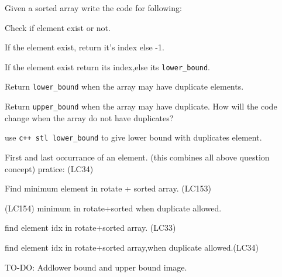 \clearpage
\begin{exercise}

     \begin{compactenum}
          \item 
     \end{compactenum}

     
\end{exercise}


\begin{exercise}
    Given a sorted array write the code for following:

   \begin{compactenum}
        \item Check if element exist or not.
        \item If the element exist, return it's index else -1.
        \item If the element exist return its index,else its \verb|lower_bound|.
        \item Return \verb|lower_bound| when the array may have duplicate elements.
        \item Return \verb|upper_bound| when the array may have duplicate. How will the code change when the array do not have duplicates?
        \item use \verb|c++ stl lower_bound| to give lower bound with duplicates element.
   \end{compactenum}

   \medskip
   \begin{compactenum}      
        \item First and last occurrance of an element. (this combines all above question concept) pratice: (LC34)
        \item Find minimum element in rotate + sorted array. (LC153)
        \item (LC154) minimum in rotate+sorted when duplicate allowed.
        \item find element idx in rotate+sorted array. (LC33)
        \item find element idx in rotate+sorted array,when duplicate allowed.(LC34)
   \end{compactenum}
\end{exercise}

TO-DO: Addlower bound and upper bound image.

